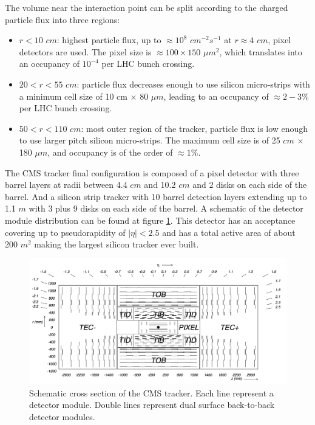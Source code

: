 The volume near the interaction point can be split according to the charged particle flux into three regions:

\begin{itemize}
  \item $r<10$ $cm$: highest particle flux, up to $\approx 10^8 $ $cm^{-2}s^{-1}$ at $r \approx 4$ $cm$, pixel detectors are used. The pixel size is $\approx 100 \times 150$ $\mu m^2$, which translates into an occupancy of $10^{-4}$ per \gls{LHC} bunch crossing.
  \item $20<r<55$ $cm$: particle flux decreases enough to use silicon micro-strips with a minimum cell size of 10 cm $\times$ 80 $\mu m$, leading to an occupancy of $\approx 2-3\%$ per \gls{LHC} bunch crossing.
  \item $50<r<110$ $cm$: most outer region of the tracker, particle flux is low enough to use larger pitch silicon micro-strips. The maximum cell size is of 25 $cm$ $\times$ 180 $\mu m$, and occupancy is of the order of $\approx 1\%$.
\end{itemize}

The \gls{CMS} tracker final configuration is composed of a pixel detector with three barrel layers at radii between 4.4 $cm$ and 10.2 $cm$ and 2 disks on each side of the barrel. And a silicon strip tracker with 10 barrel detection layers extending up to 1.1 $m$ with 3 plus 9 disks on each side of the barrel. A schematic of the detector module distribution can be found at figure \ref{FIGURE:ExperimentalApparatus_CMS_Tracker_Layout}. This detector has an acceptance covering up to pseudorapidity of $|\eta|<2.5$ and has a total active area of about 200 $m^2$ making the largest silicon tracker ever built. 

\begin{figure}[!htb]
  \centering
  \includegraphics[width=1.0\textwidth]{Chapter02/CMS/Images/CMS_Tracker_Layout.png}
  \caption{Schematic cross section of the CMS tracker. Each line represent a detector module. Double lines represent dual surface back-to-back detector modules.}
  \label{FIGURE:ExperimentalApparatus_CMS_Tracker_Layout}
\end{figure}

